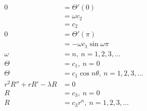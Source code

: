 \documentclass{article}
\begin{document}
\begin{align*}
  0                                                                & = \Theta'(0)                                                                                                                        \\
                                                                   & = \omega c_2                                                                                                                        \\
                                                                   & = c_2                                                                                                                               \\
  0                                                                & = \Theta'(\pi)                                                                                                                      \\
                                                                   & = -\omega c_1 \sin \omega \pi                                                                                                       \\
  \omega                                                           & = n,\ n = 1, 2, 3, \ldots                                                                                                           \\
  \Theta                                                           & = c_1,\ n = 0                                                                                                                       \\
  \Theta                                                           & = c_1 \cos n \theta,\ n = 1, 2, 3, \ldots                                                                                           \\
  r^2 R'' + r R' - \lambda R                                       & = 0                                                                                                                                 \\
  R                                                                & = c_3,\ n = 0                                                                                                                       \\
  R                                                                & = c_3 r^n,\ n = 1, 2, 3, \ldots                                                                                                     \\

\end{align*}
\end{document}

